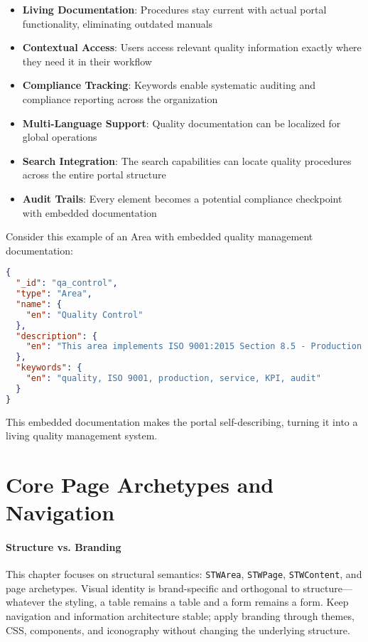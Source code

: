 \begin{itemize}
\item \textbf{Living Documentation}: Procedures stay current with actual portal functionality, eliminating outdated manuals
\item \textbf{Contextual Access}: Users access relevant quality information exactly where they need it in their workflow
\item \textbf{Compliance Tracking}: Keywords enable systematic auditing and compliance reporting across the organization
\item \textbf{Multi-Language Support}: Quality documentation can be localized for global operations
\item \textbf{Search Integration}: The \studio{} search capabilities can locate quality procedures across the entire portal structure
\item \textbf{Audit Trails}: Every element becomes a potential compliance checkpoint with embedded documentation
\end{itemize}

Consider this example of an Area with embedded quality management documentation:

\begin{lstlisting}[language=JSON,caption={Area with Quality Management Documentation},label={lst:quality-area}]
{
  "_id": "qa_control",
  "type": "Area",
  "name": {
    "en": "Quality Control"
  },
  "description": {
    "en": "This area implements ISO 9001:2015 Section 8.5 - Production and Service Provision. All processes documented here follow our Quality Manual QM-2024-Rev3. Key Performance Indicators: Defect Rate < 0.1%, Customer Satisfaction > 95%."
  },
  "keywords": {
    "en": "quality, ISO 9001, production, service, KPI, audit"
  }
}
\end{lstlisting}

This embedded documentation makes the portal self-describing, turning it into a living quality management system.

\section{Core Page Archetypes and Navigation}
\label{sec:page-archetypes}

\paragraph{Structure vs. Branding}
This chapter focuses on structural semantics: \texttt{STWArea}, \texttt{STWPage}, \texttt{STWContent}, and page archetypes. Visual identity is brand-specific and orthogonal to structure—whatever the styling, a table remains a table and a form remains a form. Keep navigation and information architecture stable; apply branding through themes, CSS, components, and iconography without changing the underlying structure.

